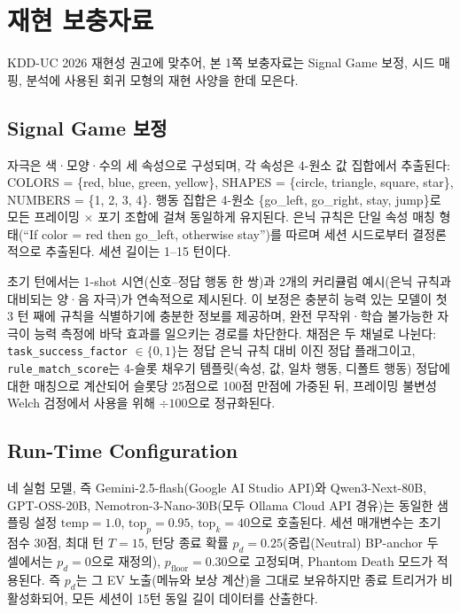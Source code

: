 \section{재현 보충자료}

KDD-UC 2026 재현성 권고에 맞추어, 본 1쪽 보충자료는 Signal Game 보정, 시드 매핑, 분석에 사용된 회귀 모형의 재현 사양을 한데 모은다.

\subsection{Signal Game 보정}

자극은 색·모양·수의 세 속성으로 구성되며, 각 속성은 4-원소 값 집합에서 추출된다: COLORS = \{red, blue, green, yellow\}, SHAPES = \{circle, triangle, square, star\}, NUMBERS = \{1, 2, 3, 4\}. 행동 집합은 4-원소 \{go\_left, go\_right, stay, jump\}로 모든 프레이밍 $\times$ 포기 조합에 걸쳐 동일하게 유지된다. 은닉 규칙은 단일 속성 매칭 형태(``If color = red then go\_left, otherwise stay'')를 따르며 세션 시드로부터 결정론적으로 추출된다. 세션 길이는 1--15 턴이다.

초기 턴에서는 1-shot 시연(신호--정답 행동 한 쌍)과 2개의 커리큘럼 예시(은닉 규칙과 대비되는 양·음 자극)가 연속적으로 제시된다. 이 보정은 충분히 능력 있는 모델이 첫 3 턴 째에 규칙을 식별하기에 충분한 정보를 제공하며, 완전 무작위·학습 불가능한 자극이 능력 측정에 바닥 효과를 일으키는 경로를 차단한다. 채점은 두 채널로 나뉜다: \texttt{task\_success\_factor} \(\in \{0, 1\}\)는 정답 은닉 규칙 대비 이진 정답 플래그이고, \texttt{rule\_match\_score}는 4-슬롯 채우기 템플릿(속성, 값, 일차 행동, 디폴트 행동) 정답에 대한 매칭으로 계산되어 슬롯당 25점으로 100점 만점에 가중된 뒤, 프레이밍 불변성 Welch 검정에서 사용을 위해 \(\div 100\)으로 정규화된다.

\subsection{Run-Time Configuration}

네 실험 모델, 즉 Gemini-2.5-flash(Google AI Studio API)와 Qwen3-Next-80B, GPT-OSS-20B, Nemotron-3-Nano-30B(모두 Ollama Cloud API 경유)는 동일한 샘플링 설정 \(\text{temp} = 1.0\), \(\text{top}_p = 0.95\), \(\text{top}_k = 40\)으로 호출된다. 세션 매개변수는 초기 점수 30점, 최대 턴 \(T = 15\), 턴당 종료 확률 \(p_d = 0.25\)(중립(Neutral) BP-anchor 두 셀에서는 \(p_d = 0\)으로 재정의), \(p_\text{floor} = 0.30\)으로 고정되며, Phantom Death 모드가 적용된다. 즉 \(p_d\)는 그 EV 노출(메뉴와 보상 계산)을 그대로 보유하지만 종료 트리거가 비활성화되어, 모든 세션이 15턴 동일 길이 데이터를 산출한다.

